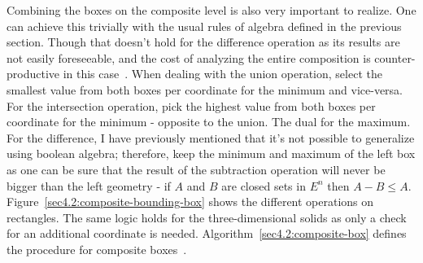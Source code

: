 \documentclass[a4paper,11pt,oneside]{article}
\begin{document}
Combining the boxes on the composite level is also very important to realize. One can achieve this trivially with the usual rules of algebra defined in the previous section. Though that doesn't hold for the difference operation as its results are not easily foreseeable, and the cost of analyzing the entire composition is counter-productive in this case~\cite{ROTH1982109}. When dealing with the union operation, select the smallest value from both boxes per coordinate for the minimum and vice-versa. For the intersection operation, pick the highest value from both boxes per coordinate for the minimum - opposite to the union.
The dual for the maximum.  For the difference, I have previously mentioned that it's not possible to generalize using boolean algebra; therefore, keep the minimum and maximum of the left box as one can be sure that the result of the subtraction operation will never be bigger than the left geometry - if $A$ and $B$ are closed sets in $E^n$ then $A - B \leq A$. Figure~\ref{sec4.2:composite-bounding-box} shows the different operations on rectangles. The same logic holds for the three-dimensional solids as only a check for an additional coordinate is needed. Algorithm~\ref{sec4.2:composite-box} defines the procedure for composite boxes~\cite{ROTH1982109}.
\end{document}
